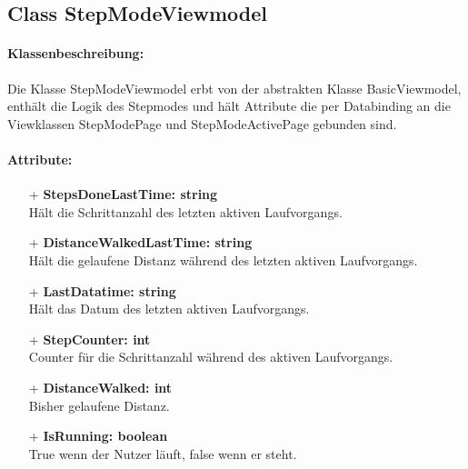 \documentclass[a4paper,12pt]{article}
\begin{document}
\subsection{Class StepModeViewmodel}

\paragraph{Klassenbeschreibung:}
Die Klasse StepModeViewmodel erbt von der abstrakten Klasse BasicViewmodel, enthält die Logik des Stepmodes  und hält Attribute die per Databinding an die Viewklassen StepModePage und StepModeActivePage gebunden sind. 
\paragraph{Attribute:}
\begin{itemize}
	\item[+] \textbf{StepsDoneLastTime: string} \\ Hält die Schrittanzahl des letzten aktiven Laufvorgangs. 
	\item[+] \textbf{DistanceWalkedLastTime: string} \\ Hält die gelaufene Distanz während des letzten aktiven Laufvorgangs. 
	\item[+] \textbf{LastDatatime: string} \\ Hält das Datum des letzten aktiven Laufvorgangs. 
	\item[+] \textbf{StepCounter: int} \\ Counter für die Schrittanzahl während des aktiven Laufvorgangs. 
	\item[+] \textbf{DistanceWalked: int} \\  Bisher gelaufene Distanz. 
	\item[+] \textbf{IsRunning: boolean} \\ True wenn der Nutzer läuft, false wenn er steht. 
\end{itemize}
\end{document}
